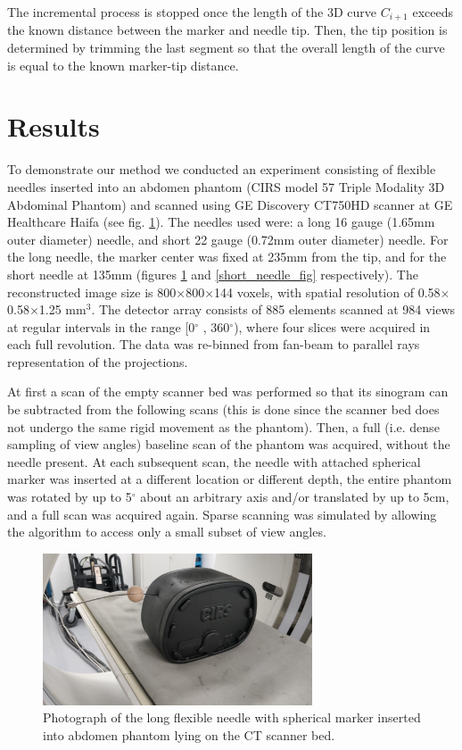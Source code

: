 \documentclass[letterpaper, 11 pt, conference]{ieeeconf} %
\begin{document}
The incremental process is stopped once the length of the 3D curve $C_{i+1}$ exceeds the known distance between the marker and needle tip. Then, the tip position is determined by trimming the last segment so that the overall length of the curve is equal to the known marker-tip distance.



\section{Results}

To demonstrate our method we conducted an experiment consisting of flexible needles inserted into an abdomen phantom (CIRS model 57 Triple Modality 3D Abdominal Phantom) and scanned using GE Discovery CT750HD scanner at GE Healthcare Haifa (see fig. \ref{long_needle_fig}). The needles used were: a long 16 gauge (1.65mm outer diameter) needle, and short 22 gauge (0.72mm outer diameter) needle. For the long needle, the marker center was fixed at 235mm from the tip, and for the short needle at 135mm (figures \ref{long_needle_fig} and \ref{short_needle_fig} respectively).
The reconstructed image size is 800$\times$800$\times$144 voxels, with spatial resolution of 0.58$\times$0.58$\times$1.25 mm$^3$. The detector array consists of 885 elements scanned at 984 views at regular intervals in the range [0$^{\circ}$ , 360$^{\circ}$), where four slices were acquired in each full revolution. The data was re-binned from fan-beam to parallel rays representation of the projections.

At first a scan of the empty scanner bed was performed so that its sinogram can be subtracted from the following scans (this is done since the scanner bed does not undergo the same rigid movement as the phantom). Then, a full (i.e. dense sampling of view angles) baseline scan of the phantom was acquired, without the needle present. At each subsequent scan, the needle with attached spherical marker was inserted at a different location or different depth, the entire phantom was rotated by up to 5$^\circ$ about an arbitrary axis and/or translated by up to 5cm, and a full scan was acquired again. Sparse scanning was simulated by allowing the algorithm to access only a small subset of view angles.


\begin{figure}[b]
\centering
\includegraphics[width=8cm]{long_needle_phantom.jpg}
\caption{\small{Photograph of the long flexible needle with spherical marker inserted into abdomen phantom lying on the CT scanner bed.}}
\label{long_needle_fig}
\end{figure}
\end{document}
